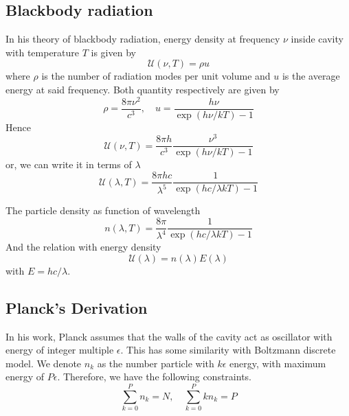 \documentclass[../../../Main.tex]{subfiles}
\begin{document}
\subsection*{Blackbody radiation}
In his theory of blackbody radiation, energy density at frequency $\nu$ inside cavity with temperature $T$ is given by
\begin{equation*}
    \mathcal{U}(\nu,T)=\rho u
\end{equation*}
where $\rho$ is the number of radiation modes per unit volume and $u$ is the average energy at said frequency. Both quantity respectively are given by 
\begin{equation*}
    \rho=\frac{8\pi\nu^2}{c^3},\quad u=\frac{h\nu}{\exp(h\nu/k T)-1}
\end{equation*}
Hence
\begin{equation*}
    \mathcal{U}(\nu,T)=\frac{8\pi h}{c^3}\frac{\nu^3}{\exp(h\nu/k T)-1}
\end{equation*}
or, we can write it in terms of $\lambda$
\begin{equation*}
    \mathcal{U}(\lambda,T)=\frac{8\pi hc}{\lambda^5}\frac{1}{\exp(hc/\lambda k T)-1}
\end{equation*}

The particle density as function of wavelength
\begin{equation*}
    n(\lambda,T)=\frac{8\pi}{\lambda^4}\frac{1}{\exp(hc/\lambda k T)-1}
\end{equation*} 
And the relation with energy density
\begin{equation*}
    \mathcal{U}(\lambda)=n(\lambda)E(\lambda)
\end{equation*}
with $E=hc/\lambda$. 

\subsection*{Planck's Derivation}

In his work, Planck assumes that the walls of the cavity act as oscillator with  energy of integer multiple $\epsilon$. This has some similarity with Boltzmann discrete model. We denote $n_k$ as the number particle with $k\epsilon$ energy, with maximum energy of $P\epsilon$. Therefore, we have the following constraints.
\begin{equation*}
    \sum_{k=0}^{P}n_k=N,\quad\sum_{k=0}^{P}kn_k=P
\end{equation*}
\end{document}
